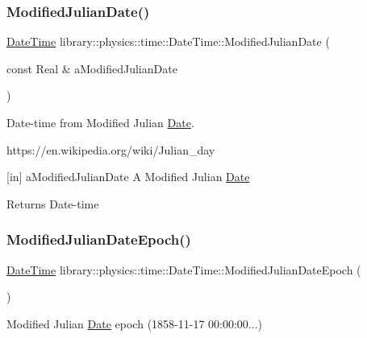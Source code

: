 \subsubsection{\texorpdfstring{Modified\+Julian\+Date()}{ModifiedJulianDate()}}
{\footnotesize\ttfamily \hyperlink{classlibrary_1_1physics_1_1time_1_1_date_time}{Date\+Time} library\+::physics\+::time\+::\+Date\+Time\+::\+Modified\+Julian\+Date (\begin{DoxyParamCaption}\item[{const Real \&}]{a\+Modified\+Julian\+Date }\end{DoxyParamCaption})\hspace{0.3cm}{\ttfamily [static]}}



Date-\/time from Modified Julian \hyperlink{classlibrary_1_1physics_1_1time_1_1_date}{Date}. 

https\+://en.wikipedia.\+org/wiki/\+Julian\+\_\+day

\mbox{[}in\mbox{]} a\+Modified\+Julian\+Date A Modified Julian \hyperlink{classlibrary_1_1physics_1_1time_1_1_date}{Date} \begin{DoxyReturn}{Returns}
Date-\/time 
\end{DoxyReturn}
\mbox{\label{classlibrary_1_1physics_1_1time_1_1_date_time_a7aecc9cd84e3d197165b1486c0b63c64}} 
\subsubsection{\texorpdfstring{Modified\+Julian\+Date\+Epoch()}{ModifiedJulianDateEpoch()}}
{\footnotesize\ttfamily \hyperlink{classlibrary_1_1physics_1_1time_1_1_date_time}{Date\+Time} library\+::physics\+::time\+::\+Date\+Time\+::\+Modified\+Julian\+Date\+Epoch (\begin{DoxyParamCaption}{ }\end{DoxyParamCaption})\hspace{0.3cm}{\ttfamily [static]}}



Modified Julian \hyperlink{classlibrary_1_1physics_1_1time_1_1_date}{Date} epoch (1858-\/11-\/17 00\+:00\+:00...) 


